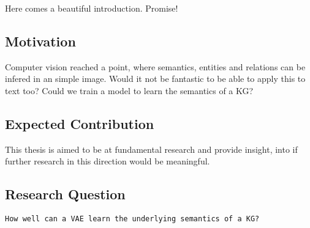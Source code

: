 Here comes a beautiful introduction. Promise!

\subsection{Motivation}

Computer vision reached a point, where semantics, entities and relations can be infered in an simple image.
Would it not be fantastic to be able to apply this to text too?
Could we train a model to learn the semantics of a KG?

\subsection{Expected Contribution}

This thesis is aimed to be at fundamental research and provide insight, into if further research in this direction would be meaningful.

\subsection{Research Question}

\texttt{How well can a VAE learn the underlying semantics of a KG?}
